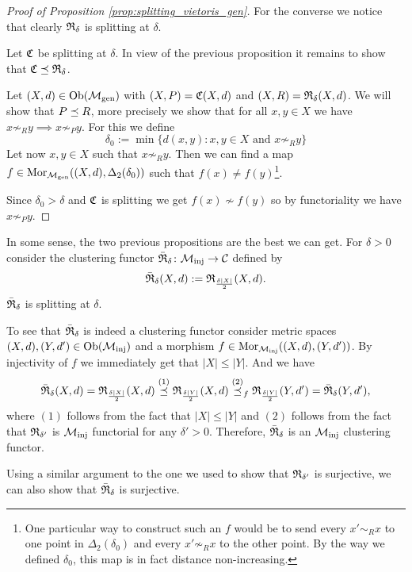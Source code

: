 \begin{proof}[Proof of Proposition \ref{prop:splitting_vietoris_gen}]
    For the converse we notice that clearly $\mathfrak{R}_\delta$ is splitting at $\delta$.

    \medskip
    Let $\mathfrak{C}$ be splitting at $\delta$. In view of the previous proposition it remains to show that $\mathfrak{C} \preceq \mathfrak{R}_\delta$.
        
    Let $(X,d) \in \mathrm {Ob}({\mathcal{M}_\mathrm{gen}})$ with $(X,P) = \mathfrak{C}(X,d)$ and $(X,R) = \mathfrak{R}_\delta(X,d)$. We will show that $P \preceq R$, more precisely we show that for all $x,y \in X$ we have $x \not\sim_R y \implies x \not\sim_P y$. For this we define
    $$
    \delta_0 := \min\{d(x,y): x,y \in X \text{ and } x \not\sim_R y\}
    $$
    Let now $x,y \in X$ such that $x \not\sim_R y$.
    Then we can find a map $f \in \mathrm {Mor}_{\mathcal{M}_\mathrm{gen}}((X,d), \Delta_2(\delta_0))$ such that $f(x) \neq f(y)$\footnote{One particular way to construct such an $f$ would be to send every $x' \sim_R x$ to one point in $\Delta_2(\delta_0)$ and every $x' \not\sim_R x$ to the other point. By the way we defined $\delta_0$, this map is in fact distance non-increasing.}.

    Since $\delta_0 > \delta$ and $\mathfrak{C}$ is splitting we get $f(x) \not\sim f(y)$ so by functoriality we have $x \not\sim_P y$.
\end{proof}

\begin{example}{}{}
In some sense, the two previous propositions are the best we can get.
For $\delta>0$ consider the clustering functor $\bar{\mathfrak{R}}_\delta\colon {\mathcal{M}_\mathrm{inj}} \to \mathcal{C}$ defined by
$$
\bar{\mathfrak{R}}_\delta(X,d) := \mathfrak{R}_{\frac{\delta|X|}{2}}(X,d).
$$
$\bar{\mathfrak{R}}_\delta$ is splitting at $\delta$.

\medskip
To see that $\bar{\mathfrak{R}}_\delta$ is indeed a clustering functor consider metric spaces ${(X,d), (Y,d') \in \mathrm {Ob}({\mathcal{M}_\mathrm{inj}})}$ and a morphism $f \in \mathrm {Mor}_{\mathcal{M}_\mathrm{inj}}((X,d), (Y,d'))$. By injectivity of $f$ we immediately get that $|X| \le |Y|$. And we have
$$
\bar{\mathfrak{R}}_\delta(X,d) = \mathfrak{R}_{\frac{\delta|X|}{2}}(X,d) \overset{(1)}{\preceq} \mathfrak{R}_{\frac{\delta|Y|}{2}}(X,d) \overset{(2)}{\preceq}_f \mathfrak{R}_{\frac{\delta|Y|}{2}}(Y,d') = \bar{\mathfrak{R}}_\delta(Y,d'),
$$
where $(1)$ follows from the fact that $|X| \le |Y|$ and $(2)$ follows from the fact that $\mathfrak{R}_{\delta'}$ is ${\mathcal{M}_\mathrm{inj}}$ functorial for any $\delta' > 0$. Therefore, $\bar{\mathfrak{R}}_\delta$ is an ${\mathcal{M}_\mathrm{inj}}$ clustering functor.

\medskip
Using a similar argument to the one we used to show that $\mathfrak{R}_{\delta'}$ is surjective, we can also show that $\bar{\mathfrak{R}}_\delta$ is surjective.
\end{example}

